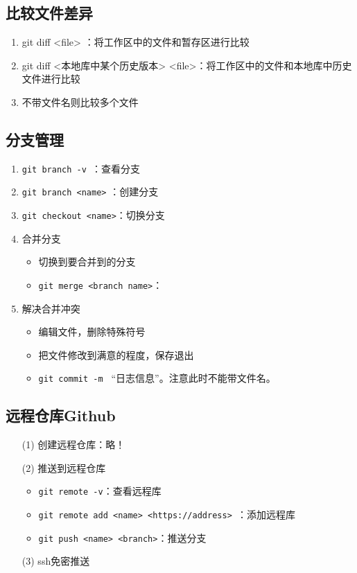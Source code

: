 \subsection{比较文件差异}
\begin{enumerate}
\item git diff <file> ：将工作区中的文件和暂存区进行比较
\item git diff <本地库中某个历史版本> <file>：将工作区中的文件和本地库中历史文件进行比较
\item 不带文件名则比较多个文件
\end{enumerate}



\subsection{分支管理}
\begin{enumerate}
\item \verb|git branch -v |：查看分支
\item \verb|git branch <name>| ：创建分支
\item \verb|git checkout <name>|：切换分支
\item 合并分支
\begin{itemize}
\item 切换到要合并到的分支
\item \verb|git merge <branch name>|：
\end{itemize}
\item 解决合并冲突
\begin{itemize}
\item  编辑文件，删除特殊符号
\item 把文件修改到满意的程度，保存退出
\item \verb|git commit -m | ``日志信息''。注意此时不能带文件名。
\end{itemize}
\end{enumerate}



\subsection{远程仓库Github}
\begin{itemize}
\item[(1)] 创建远程仓库：略！

\item[(2)] 推送到远程仓库
\begin{itemize}
\item \verb|git remote -v|：查看远程库
\item \verb|git remote add <name> <https://address> |：添加远程库
\item \verb|git push <name> <branch>|：推送分支
\end{itemize}

\item [(3)] ssh免密推送
\end{itemize}


